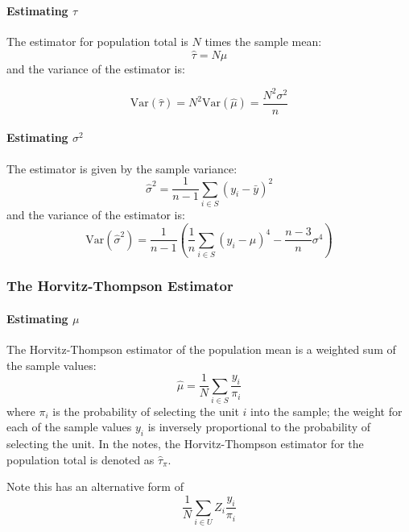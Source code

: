 \documentclass{article}
\begin{document}
\paragraph{Estimating $\tau$} The estimator for population total is $N$ times the sample mean:
\begin{equation}
    \hat{\tau} = N\hat{\mu}
\end{equation}
and the variance of the estimator is:

\begin{equation}
    \mathrm{Var}(\hat{\tau}) = N^2\mathrm{Var}(\hat{\mu}) = \frac{N^2\sigma^2}{n}
\end{equation}

\paragraph{Estimating $\sigma^2$} The estimator is given by the sample variance:
\begin{equation}
    \hat{\sigma}^2 = \frac{1}{n-1}\sum_{i\in S} (y_i-\bar{y})^2
\end{equation}
and the variance of the estimator is:
\begin{equation}
    \mathrm{Var}(\hat{\sigma}^2) = \frac{1}{n-1}\left(\frac{1}{n}\sum_{i\in S} (y_i-\mu)^4 - \frac{n-3}{n}\sigma^4\right)
\end{equation}


\subsubsection{The Horvitz-Thompson Estimator}
\paragraph{Estimating $\mu$} The Horvitz-Thompson estimator of the population mean is a weighted sum of the sample values:
\begin{equation}
    \hat{\mu} = \frac{1}{N}\sum_{i\in S} \frac{y_i}{\pi_i}
\end{equation}
where $\pi_i$ is the probability of selecting the unit $i$ into the sample; the weight for each of the sample values $y_i$ is inversely proportional to the probability of selecting the unit. In the notes, the Horvitz-Thompson estimator for the population total is denoted as $\hat{\tau}_{\pi}$.

Note this has an alternative form of 
\[
    \frac{1}{N}\sum_{i\in U} Z_i\frac{y_i}{\pi_i}
\]
\end{document}
